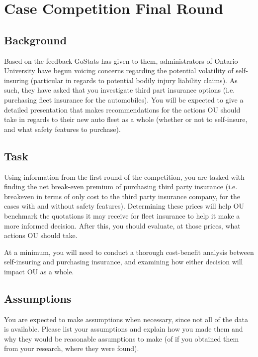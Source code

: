 \documentclass[12pt]{article}
\begin{document}
\section{Case Competition Final Round}

\subsection{Background}

Based on the feedback GoStats has given to them, administrators of Ontario University have begun voicing concerns regarding the potential volatility of self-insuring (particular in regards to potential bodily injury liability claims). As such, they have asked that you investigate third part insurance options  (i.e. purchasing fleet insurance for the automobiles). You will be expected to give a detailed presentation that makes recommendations for the actions OU should take in regards to their new auto fleet as a whole (whether or not to self-insure, and what safety features to purchase).

\subsection{Task}

Using information from the first round of the competition, you are tasked with finding the net break-even premium of purchasing third party insurance (i.e. breakeven in terms of only cost to the third party insurance company, for the cases with and without safety features). Determining these prices will help OU benchmark the quotations it may receive for fleet insurance to help it make a more informed decision. After this, you should evaluate, at those prices, what actions OU should take.

At a minimum, you will need to conduct a thorough cost-benefit analysis between self-insuring and purchasing insurance, and examining how either decision will impact OU as a whole.

\subsection{Assumptions}

You are expected to make assumptions when necessary, since not all of the data is available. Please list your assumptions and explain how you made them and why they would be reasonable assumptions to make (of if you obtained them from your research, where they were found).
\end{document}
